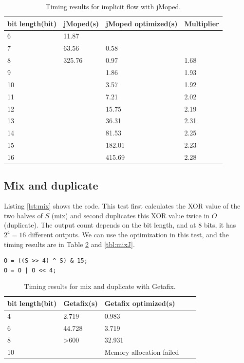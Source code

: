 \begin{table}[!h]
\begin{center}
\begin{tabular}{|l|l|l|l|}
\hline
bit length(bit) & jMoped(s) & jMoped optimized(s) & Multiplier \\ \hline
6 & 11.87 &  &  \\ \hline
7 & 63.56 & 0.58 &  \\ \hline
8 & 325.76 & 0.97 & 1.68 \\ \hline
9 &  & 1.86 & 1.93 \\ \hline
10 &  & 3.57 & 1.92 \\ \hline
11 &  & 7.21 & 2.02 \\ \hline
12 &  & 15.75 & 2.19 \\ \hline
13 &  & 36.31 & 2.31 \\ \hline
14 &  & 81.53 & 2.25 \\ \hline
15 &  & 182.01 & 2.23 \\ \hline
16 &  & 415.69 & 2.28 \\ \hline
\end{tabular}
\end{center}
\caption{Timing results for implicit flow with jMoped.}
\label{tbl:implicitJ}
\end{table}


\subsection{Mix and duplicate}
Listing \ref{lst:mix} shows the code. This test first calculates the XOR value of the two halves of $S$ (mix) and second duplicates this XOR value twice in $O$ (duplicate). The output count depends on the bit length, and at $8$ bits, it has $2^{4} = 16$ different outputs. We can use the optimization in this test, and the timing results are in Table \ref{tbl:mixG} and \ref{tbl:mixJ}.

\lstset{language=C}  
\begin{lstlisting}[float=!h, caption={Mix and duplicate test program at 8 bits.},label=lst:mix]
O = ((S >> 4) ^ S) & 15;
O = O | O << 4;
\end{lstlisting}

\begin{table}[!h]
\centering
\begin{tabular}{|l|l|l|l|l|}
\hline
{bit length(bit)} & Getafix(s) & {Getafix optimized(s)} \\ \hline
4 & {2.719} & 0.983  \\ \hline
6 & {44.728} & 3.719 \\ \hline
8 & \textgreater 600 & 32.931 \\ \hline
10 &  & {Memory allocation failed}  \\ \hline
\end{tabular}
\caption{Timing results for mix and duplicate with Getafix.}
\label{tbl:mixG}
\end{table}


